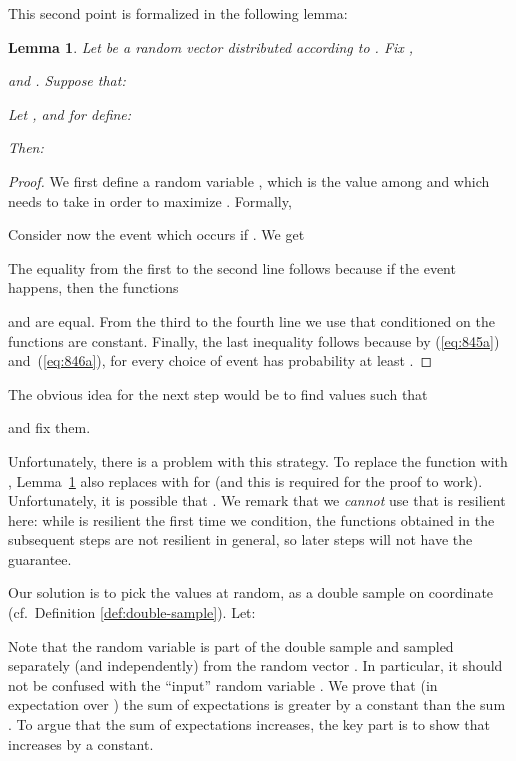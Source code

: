 \documentclass{daj}
\newcommand{\1}{\mathbbm{1}}
\theoremstyle{plain}
\newtheorem{lemma}[theorem]{Lemma}
\theoremstyle{definition}
\begin{document}
This second point is formalized in the following lemma:
\begin{lemma}\label{lem:maximumKeepsProbability}
  Let  be a random vector distributed according to
  .  Fix ,
  
  and
  .  Suppose that:

Let , and
for  define:

Then:

\end{lemma}
\begin{proof}
We first define a random variable , 
which is the value among  and  which  needs to take 
in order to maximize . 
Formally,

Consider now the event  which occurs if 
.
We get


The equality from the first to the second line follows because
if the event  happens, then the functions 
 
and  are equal.
From the third to the fourth line we use that conditioned on 
 the 
functions  are constant.
Finally, the last inequality follows because by (\ref{eq:845a})
and~(\ref{eq:846a}), for every choice of
 event 
has probability at least .
\end{proof}

The obvious idea for the next step would be to 
find values 
such that 

and fix them.

Unfortunately, there is a problem with this strategy.  To replace 
the function  with
, Lemma~\ref{lem:maximumKeepsProbability} also
replaces  with  for  (and this is
required for the proof to work).  Unfortunately, it is possible that
.
We remark that we \emph{cannot} use that  is resilient here: while
 is resilient the first time we condition, the functions
 obtained in the subsequent steps are not resilient in general,
so later steps will not have the guarantee.

\medskip

Our solution is to pick the values  at
random, as a double sample on coordinate  
(cf.~Definition \ref{def:double-sample}).
Let:

Note that the random variable  is part of the double sample
 and sampled separately (and independently)
from the random vector . In particular, it should
not be confused with the ``input'' random variable .
We prove that (in expectation over 
) the sum of expectations
 is greater by a constant than
the sum .
To argue that the sum of expectations increases, the key part is to show that
 increases by a constant.
\end{document}
